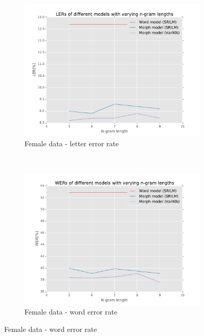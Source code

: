 \documentclass[b5paper]{article}
\begin{document}
\begin{figure}[!h]
\centering
\begin{subfigure}[b]{.4\textwidth}

\includegraphics[width=\textwidth]{figures/smeF-complete_wikipedia-ler}
\caption{Female data - letter error rate}
\end{subfigure}~
\begin{subfigure}[b]{.4\textwidth}
\includegraphics[width=\textwidth]{figures/smeF-complete_wikipedia-wer}
\caption{Female data - word error rate}
\end{subfigure}


\end{figure}
\end{document}
